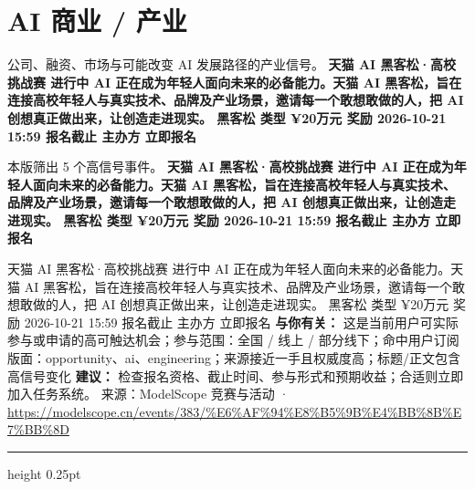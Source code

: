 \documentclass[10.5pt]{ctexart}
\begin{document}
\section*{AI 商业 / 产业}
{\color{ormuted} 公司、融资、市场与可能改变 AI 发展路径的产业信号。}
\vspace{2mm}
{\LARGE\bfseries 天猫 AI 黑客松·高校挑战赛 进行中 AI 正在成为年轻人面向未来的必备能力。天猫 AI 黑客松，旨在连接高校年轻人与真实技术、品牌及产业场景，邀请每一个敢想敢做的人，把 AI 创想真正做出来，让创造走进现实。 黑客松 类型 ¥20万元 奖励 2026-10-21 15:59 报名截止 主办方 立即报名}\par
\vspace{1mm}
{\color{ormuted} 本版筛出 5 个高信号事件。}
\vspace{3mm}
{\Large\bfseries 天猫 AI 黑客松·高校挑战赛 进行中 AI 正在成为年轻人面向未来的必备能力。天猫 AI 黑客松，旨在连接高校年轻人与真实技术、品牌及产业场景，邀请每一个敢想敢做的人，把 AI 创想真正做出来，让创造走进现实。 黑客松 类型 ¥20万元 奖励 2026-10-21 15:59 报名截止 主办方 立即报名}\par
天猫 AI 黑客松·高校挑战赛 进行中 AI 正在成为年轻人面向未来的必备能力。天猫 AI 黑客松，旨在连接高校年轻人与真实技术、品牌及产业场景，邀请每一个敢想敢做的人，把 AI 创想真正做出来，让创造走进现实。 黑客松 类型 ¥20万元 奖励 2026-10-21 15:59 报名截止 主办方 立即报名
\textbf{与你有关：} 这是当前用户可实际参与或申请的高可触达机会；参与范围：全国 / 线上 / 部分线下；命中用户订阅版面：opportunity、ai、engineering；来源接近一手且权威度高；标题/正文包含高信号变化
\textbf{建议：} 检查报名资格、截止时间、参与形式和预期收益；合适则立即加入任务系统。
{\footnotesize\color{ormuted} 来源：ModelScope 竞赛与活动 · \url{https://modelscope.cn/events/383/%E6%AF%94%E8%B5%9B%E4%BB%8B%E7%BB%8D}}
\vspace{4mm}
\hrule height 0.25pt
\vspace{3mm}
\end{document}
